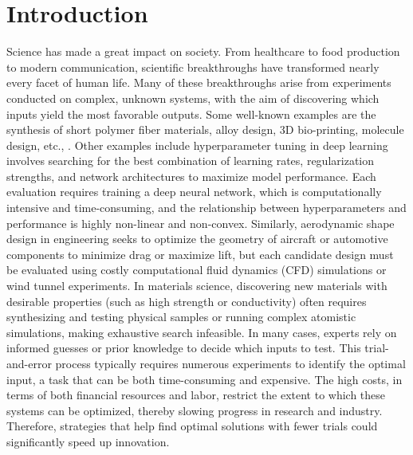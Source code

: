 \chapter{Introduction} %

\label{chap:introduction} %


\newcommand{\keyword}[1]{\textbf{#1}}
\newcommand{\tabhead}[1]{\textbf{#1}}
\newcommand{\code}[1]{\texttt{#1}}
\newcommand{\file}[1]{\texttt{\bfseries#1}}
\newcommand{\option}[1]{\texttt{\itshape#1}}

Science has made a great impact on society. From healthcare to food production to modern communication, scientific breakthroughs have transformed nearly every facet of human life. Many of these breakthroughs arise from experiments conducted on complex, unknown systems, with the aim of discovering which inputs yield the most favorable outputs. Some well-known examples are the synthesis of short polymer fiber materials, alloy design, 3D bio-printing, molecule design, etc., \citep{greenhill2020bayesian, shahriari2015taking}. Other examples include hyperparameter tuning in deep learning involves searching for the best combination of learning rates, regularization strengths, and network architectures to maximize model performance. Each evaluation requires training a deep neural network, which is computationally intensive and time-consuming, and the relationship between hyperparameters and performance is highly non-linear and non-convex. Similarly, aerodynamic shape design in engineering seeks to optimize the geometry of aircraft or automotive components to minimize drag or maximize lift, but each candidate design must be evaluated using costly computational fluid dynamics (CFD) simulations or wind tunnel experiments. In materials science, discovering new materials with desirable properties (such as high strength or conductivity) often requires synthesizing and testing physical samples or running complex atomistic simulations, making exhaustive search infeasible. In many cases, experts rely on informed guesses or prior knowledge to decide which inputs to test. This trial-and-error process typically requires numerous experiments to identify the optimal input, a task that can be both time-consuming and expensive. The high costs, in terms of both financial resources and labor, restrict the extent to which these systems can be optimized, thereby slowing progress in research and industry. Therefore, strategies that help find optimal solutions with fewer trials could significantly speed up innovation.

